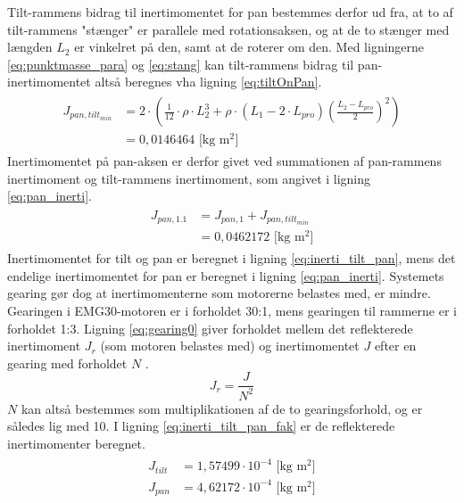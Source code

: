 Tilt-rammens bidrag til inertimomentet for pan bestemmes derfor ud fra, at to af tilt-rammens "stænger" er parallele med
rotationsaksen, og at de to stænger med længden \({L_{2}}\) er vinkelret på den, samt at de roterer om den.
Med ligningerne \ref{eq:punktmasse_para} og \ref{eq:stang}
kan tilt-rammens bidrag til pan-inertimomentet altså beregnes vha ligning \ref{eq:tiltOnPan}.
\begin{align}
\begin{split}
J_{pan,tilt_{min}}&=2\cdot{}\left(\frac{1}{12}\cdot{}\rho\cdot{}L_{2}^3
+\rho\cdot{}\left(L_1-2\cdot{}L_{pro}\right)\left(\frac{L_2-L_{pro}}{2}\right)^2\right)
\\
&=0,0146464 \text{ [kg m$^2$]}
\end{split}
\label{eq:tiltOnPan} 
\end{align}
Inertimomentet på pan-aksen er derfor givet ved summationen af pan-rammens inertimoment og tilt-rammens inertimoment,
som angivet i ligning \ref{eq:pan_inerti}.
\begin{align}
\begin{split}
{ J }_{ pan,1.1 } &= J_{ pan,1 }+J_ { pan,tilt_{ min} }
\\
&=0,0462172 \text{ [kg m$^2$]}
\end{split}
\label{eq:pan_inerti} 
\end{align}
Inertimomentet for tilt og pan er beregnet i ligning \ref{eq:inerti_tilt_pan}, mens det endelige inertimomentet for pan er beregnet i ligning \ref{eq:pan_inerti}.
Systemets gearing gør dog at inertimomenterne som motorerne belastes med, er mindre.
Gearingen i EMG30-motoren er i forholdet 30:1, mens gearingen til rammerne er i forholdet 1:3.
Ligning \ref{eq:gearing0} giver forholdet mellem det reflekterede inertimoment \(J_r\) (som motoren belastes med)
og inertimomentet \(J\) efter en gearing med forholdet \(N\) \citep{gear_inerti}.
\begin{equation}
J_r=\frac{J}{N^2}
\label{eq:gearing0}
\end{equation}
\(N\) kan altså bestemmes som multiplikationen af de to gearingsforhold, og er således lig med 10.
I ligning \ref{eq:inerti_tilt_pan_fak} er de reflekterede inertimomenter beregnet.
\begin{align}
\label{eq:inerti_tilt_pan_fak}
\begin{split}
{J_{tilt}}&=1,57499\cdot{10}^{-4} \text{ [kg m$^2$]}
\\
{J_{pan}}&=4,62172\cdot{10}^{-4} \text{ [kg m$^2$]}
\end{split}
\end{align}
